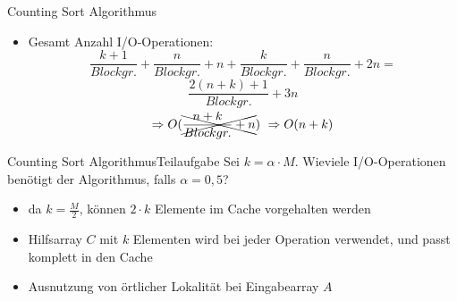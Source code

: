 \documentclass[handout]{beamer}
\begin{document}
\begin{frame}{Counting Sort Algorithmus}
  \begin{itemize}
    \item Gesamt Anzahl I/O-Operationen:
    \begin{equation*}
      \frac{k+1}{Blockgr.} +
      \frac{n}{Blockgr.} + n +
      \frac{k}{Blockgr.} +
      \frac{n}{Blockgr.} + 2n =
    \end{equation*}
    \begin{equation*}
      \frac{2(n+k)+1}{Blockgr.}+3n
    \end{equation*}
    \begin{equation*}
      \Rightarrow O(\xcancel{\frac{n+k}{Blockgr.}+n}) ~\Rightarrow
      O(n + k)
    \end{equation*}
  \end{itemize}
\end{frame}

\begin{frame}{Counting Sort Algorithmus}{Teilaufgabe}
  Sei $k = \alpha \cdot M$. Wieviele I/O-Operationen benötigt der Algorithmus, falls $\alpha = 0,5$?
  \begin{itemize}
    \item da $k = \frac{M}{2}$, können $2\cdot k$ Elemente im Cache vorgehalten werden
    \item Hilfsarray $C$ mit $k$ Elementen wird bei jeder Operation verwendet, und passt komplett in den Cache
    \item Ausnutzung von örtlicher Lokalität bei Eingabearray $A$
  \end{itemize}
\end{frame}
\end{document}
